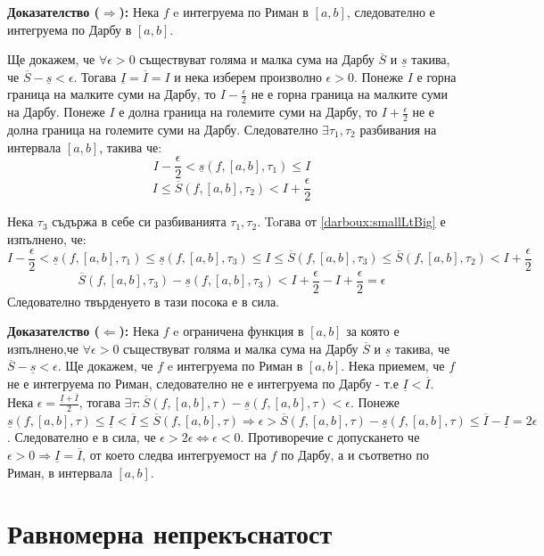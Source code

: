 \documentclass[fleqn,12pt]{article}
\begin{document}
\textbf{Доказателство ($\Longrightarrow$):} Нека $f$ e интегруема по Риман в $[a,b]$, следователно е интегруема по Дарбу в $[a,b]$.

Ще докажем, че $\forall\epsilon > 0$ съществуват голяма и малка сума на Дарбу $\overline{S}$ и $\underline{s}$ такива, че $\overline{S} - \underline{s} < \epsilon$.
Тогава $\underline{I}=\overline{I}=I$ и нека изберем произволно $\epsilon > 0$. Понеже $I$ е горна граница на малките суми на Дарбу, то 
$I - \frac{\epsilon}{2}$ не е горна граница на малките суми на Дарбу. Понеже $I$ е долна граница на големите суми на Дарбу, то $I + \frac{\epsilon}{2}$ не е долна граница на големите суми на Дарбу.
Следователно $\exists \tau_1,\tau_2$ разбивания на интервала $[a,b]$, такива че:
\[ I - \frac{\epsilon}{2} < \underline{s}(f,[a,b],\tau_1) \leq I \]
\[ I \leq \overline{S}(f,[a,b],\tau_2) < I + \frac{\epsilon}{2} \]

Нека $\tau_3$ съдържа в себе си разбиванията $\tau_1,\tau_2$. Toгава от \ref{darboux:smallLtBig} е изпълнено, че:
\[ I - \frac{\epsilon}{2} < \underline{s}(f,[a,b],\tau_1) \leq  \underline{s}(f,[a,b],\tau_3) \leq I \leq \overline{S}(f,[a,b],\tau_3) \leq \overline{S}(f,[a,b],\tau_2) < I + \frac{\epsilon}{2} \]
\[ \overline{S}(f,[a,b],\tau_3) - \underline{s}(f,[a,b],\tau_3) < I + \frac{\epsilon}{2} - I + \frac{\epsilon}{2} = \epsilon \]
Следователно твърденуето в тази посока е в сила.

\textbf{Доказателство ($\Longleftarrow$):}
Нека $f$ e ограничена функция в $[a,b]$ за която е изпълнено,че $\forall\epsilon > 0$ съществуват голяма и малка сума на Дарбу $\overline{S}$ и $\underline{s}$ такива, че $\overline{S} - \underline{s} < \epsilon$.
Ще докажем, че $f$ e интегруема по Риман в $[a,b]$. Нека приемем, че $f$ не е интегруема по Риман, следователно не е интегруема по Дарбу - т.е $\underline{I} < \overline{I}$.
Нека $\epsilon = \frac{\underline{I} + \overline{I}}{2}$, тогава $\exists\tau : \overline{S}(f,[a,b],\tau) - \underline{s}(f,[a,b],\tau) < \epsilon$.
Понеже $\underline{s}(f,[a,b],\tau) \leq \underline{I} < \overline{I} \leq \overline{S}(f,[a,b],\tau) \Longrightarrow \epsilon > \overline{S}(f,[a,b],\tau) - \underline{s}(f,[a,b],\tau) \leq \overline{I} - \underline{I} = 2\epsilon$.
Следователно е в сила, че $\epsilon > 2\epsilon \Leftrightarrow \epsilon < 0$.
Противоречие с допускането че $\epsilon>0 \Longrightarrow \underline{I}=\overline{I}$, от което следва интегруемост на $f$ по Дарбу, а и съответно по Риман, в интервала $[a,b]$.

\section{Равномерна непрекъснатост}
\end{document}

